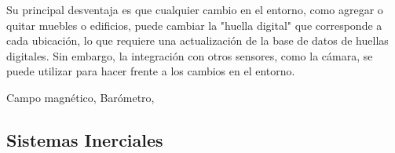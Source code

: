 Su principal desventaja es que cualquier cambio en el entorno, como agregar o quitar muebles o edificios, puede cambiar la "huella digital" que corresponde a cada ubicación, lo que requiere una actualización de la base de datos de huellas digitales. Sin embargo, la integración con otros sensores, como la cámara, se puede utilizar para hacer frente a los cambios en el entorno.

Campo magnético, Barómetro, 
\subsection{Sistemas Inerciales}